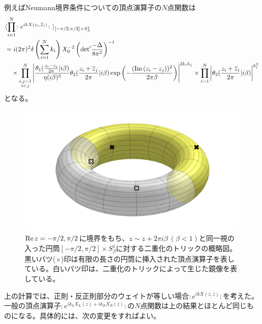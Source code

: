 例えばNeumann境界条件についての頂点演算子の$N$点関数は
\begin{align}
&\langle \prod_{i=1}^{N} \colon e^{ikX(z_i,\overline{z}_i)}\colon  \rangle_{[-\pi/2,\pi/2]\times S_\beta^1}\notag\\
&=i(2\pi)^2\delta\left(\sum_{i=1}^{N}k_i \right)X_0^{-2}\left(\text{det}' \frac{-\Delta}{8\pi^2} \right)^{-1}\notag\\
&\quad \times \prod_{\substack{i,j=1\\i<j}}^{N}\left|\frac{\theta_1(\frac{z_i-z_j}{2\pi}|i\beta)}{\eta(i\beta)^3}\theta_2(\frac{z_i+\overline{z}_j}{2\pi}|i\beta)\exp\left(-\frac{(\text{Im}\, (z_i-z_j) )^2}{2\pi\beta}\right) \right|^{2k_ik_j}\times \prod_{i=1}^{N}\left|\theta_2(\frac{z_i+\overline{z}_i}{2\pi}|i\beta)\right|^{k_i^2}
\end{align}
となる。
\begin{figure}[h]
	\centering
	\includegraphics[width=0.7\linewidth]{cylinderCF.pdf}
	\caption{$\text{Re}\, z=-\pi/2,\pi/2$に境界をもち、$z\sim z+2\pi i\beta\  (\beta<1)$と同一視の入った円筒$[-\pi/2,\pi/2]\times S_{\beta}^1$に対する二重化のトリックの概略図。黒いバツ($\times$)印は有限の長さの円筒に挿入された頂点演算子を表している。白いバツ印は、二重化のトリックによって生じた鏡像を表している。}
	\label{fig:cylindercf}
\end{figure}


上の計算では、正則・反正則部分のウェイトが等しい場合$\colon e^{ikX(z,\overline{z})}\colon $を考えた。一般の頂点演算子$\colon e^{ik_L X_L(z)+ik_R X_R(\overline{z})}\colon $の$N$点関数は上の結果とほとんど同じものになる。具体的には、次の変更をすればよい。

